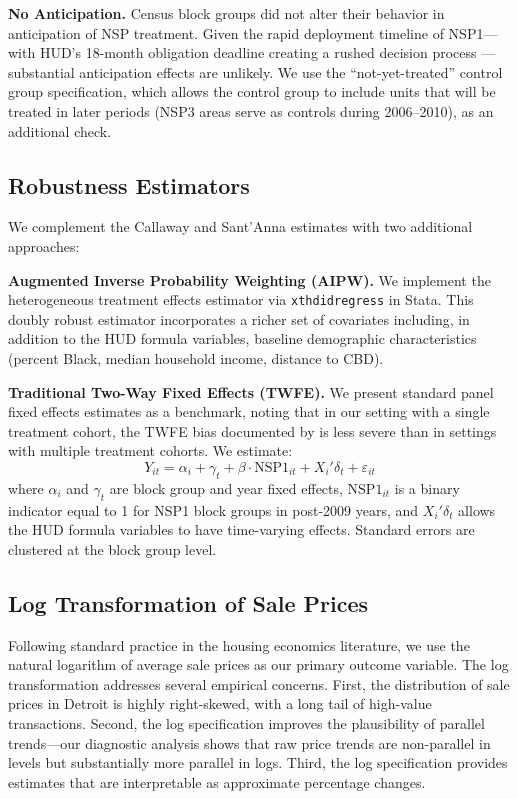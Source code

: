 \documentclass[12pt,authoryear]{elsarticle}
\begin{document}
\textbf{No Anticipation.} Census block groups did not alter their behavior in anticipation of NSP treatment. Given the rapid deployment timeline of NSP1---with HUD's 18-month obligation deadline creating a rushed decision process \citep{immergluck2013}---substantial anticipation effects are unlikely. We use the ``not-yet-treated'' control group specification, which allows the control group to include units that will be treated in later periods (NSP3 areas serve as controls during 2006--2010), as an additional check.

\subsection{Robustness Estimators}

We complement the Callaway and Sant'Anna estimates with two additional approaches:

\textbf{Augmented Inverse Probability Weighting (AIPW).} We implement the \citet{wooldridge2023} heterogeneous treatment effects estimator via \texttt{xthdidregress} in Stata. This doubly robust estimator incorporates a richer set of covariates including, in addition to the HUD formula variables, baseline demographic characteristics (percent Black, median household income, distance to CBD).

\textbf{Traditional Two-Way Fixed Effects (TWFE).} We present standard panel fixed effects estimates as a benchmark, noting that in our setting with a single treatment cohort, the TWFE bias documented by \citet{goodmanbacon2021} is less severe than in settings with multiple treatment cohorts. We estimate:
\begin{equation}
Y_{it} = \alpha_i + \gamma_t + \beta \cdot \text{NSP1}_{it} + X_i' \delta_t + \varepsilon_{it}
\label{eq:twfe}
\end{equation}
where $\alpha_i$ and $\gamma_t$ are block group and year fixed effects, $\text{NSP1}_{it}$ is a binary indicator equal to 1 for NSP1 block groups in post-2009 years, and $X_i' \delta_t$ allows the HUD formula variables to have time-varying effects. Standard errors are clustered at the block group level.

\subsection{Log Transformation of Sale Prices}

Following standard practice in the housing economics literature, we use the natural logarithm of average sale prices as our primary outcome variable. The log transformation addresses several empirical concerns. First, the distribution of sale prices in Detroit is highly right-skewed, with a long tail of high-value transactions. Second, the log specification improves the plausibility of parallel trends---our diagnostic analysis shows that raw price trends are non-parallel in levels but substantially more parallel in logs. Third, the log specification provides estimates that are interpretable as approximate percentage changes.
\end{document}
